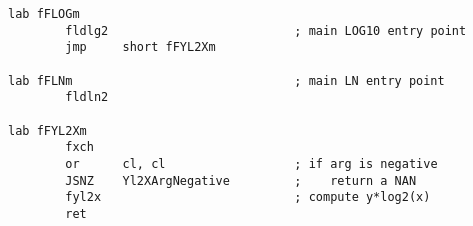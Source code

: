 \begin{lstlisting}[caption=Assembly language code,style=customasmx86]
lab fFLOGm
        fldlg2                          ; main LOG10 entry point
        jmp     short fFYL2Xm

lab fFLNm                               ; main LN entry point
        fldln2

lab fFYL2Xm
        fxch
        or      cl, cl                  ; if arg is negative
        JSNZ    Yl2XArgNegative         ;    return a NAN
        fyl2x                           ; compute y*log2(x)
        ret
\end{lstlisting}



